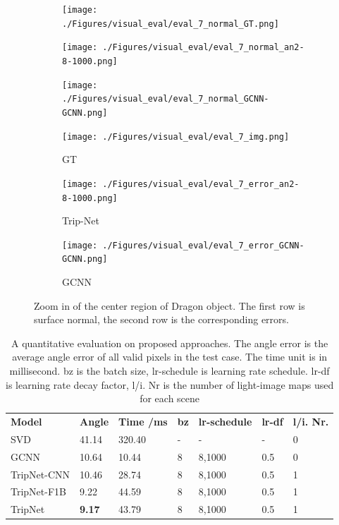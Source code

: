\documentclass[border=15pt, multi, tikz]{article}
\newcommand{\tabhead}[1]{\textbf{#1}}
\begin{document}
\begin{figure}[H]
	\centering
	\begin{subfigure}[b]{0.18\linewidth}
		\texttt{[image: ./Figures/visual\_eval/eval\_7\_normal\_GT.png]}
	\end{subfigure}
	\begin{subfigure}[b]{0.18\linewidth}
		\texttt{[image: ./Figures/visual\_eval/eval\_7\_normal\_an2-8-1000.png]}
	\end{subfigure}
	\begin{subfigure}[b]{0.18\linewidth}
		\texttt{[image: ./Figures/visual\_eval/eval\_7\_normal\_GCNN-GCNN.png]}
	\end{subfigure}
	
	\begin{subfigure}[b]{0.18\linewidth}
		\texttt{[image: ./Figures/visual\_eval/eval\_7\_img.png]}
		\caption{GT}
	\end{subfigure}
	\begin{subfigure}[b]{0.18\linewidth}
	\texttt{[image: ./Figures/visual\_eval/eval\_7\_error\_an2-8-1000.png]}
	\caption{Trip-Net}
	\end{subfigure}
	\begin{subfigure}[b]{0.18\linewidth}
		\texttt{[image: ./Figures/visual\_eval/eval\_7\_error\_GCNN-GCNN.png]}
		\caption{GCNN}
	\end{subfigure}

	
	\caption{Zoom in of the center region of Dragon object. The first row is surface normal, the second row is the corresponding errors.}
	\label{fig:tripnet-eval-synthetic-zoom-in}
\end{figure}


\begin{table}[th]
	
	\centering
	\begin{tabular}{l l l l l l l }
		\tabhead{Model} & \tabhead{Angle} & \tabhead{Time /ms} & \tabhead{bz} & \tabhead{lr-schedule} & \tabhead{lr-df} & \tabhead{l/i. Nr.}\\
		SVD  & 41.14  & 320.40 & - & - & - & 0 \\ 
		\hline
		GCNN  & 10.64 & 10.44 & 8 & 8,1000 & 0.5 & 0 \\
		\hline
		TripNet-CNN & 10.46 & 28.74 & 8 & 8,1000  & 0.5 & 1 \\
		\hline
		TripNet-F1B & 9.22 &44.59 & 8 & 8,1000  & 0.5 & 1 \\
		\hline
		TripNet & \textbf{9.17} & 43.79 & 8 & 8,1000  & 0.5 & 1 \\
	\end{tabular}
	\caption{A quantitative evaluation on proposed approaches. The angle error is the average angle error of all valid pixels in the test case. The time unit is in millisecond. bz is the batch size, lr-schedule is learning rate schedule. lr-df is learning rate decay factor, l/i. Nr is the number of light-image maps used for each scene}	
	\label{tab:model-error}
\end{table}
\end{document}
